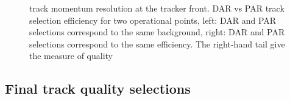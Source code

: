 \begin{figure}
  \label{fig:dar_vs_par_ann}
\caption{
  track momentum resolution at the tracker front. 
  DAR vs PAR track selection efficiency for two operational points, left: DAR and PAR selections correspond to the same background, 
  right: DAR and PAR selections correspond to the same efficiency. The right-hand tail give the measure of quality 
}
\end{figure}


\subsection{Final track quality selections}

